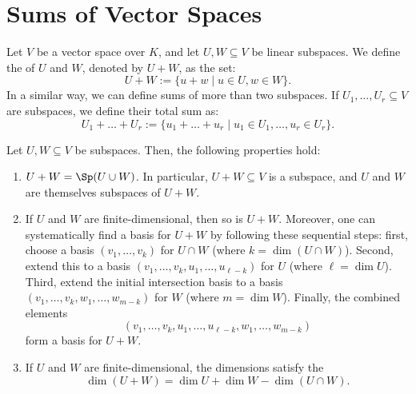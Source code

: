 \renewcommand{\thetheorem}{14.\arabic{theorem}}
\setcounter{theorem}{0}
\setcounter{chapter}{13} %


\chapter{Sums of Vector Spaces}

\begin{definition}
\label{def:sum_of_subspaces}
Let $V$ be a vector space over $K$, and let $U, W \subseteq V$ be linear subspaces. We define the  of $U$ and $W$, denoted by $U + W$, as the set:
\[
U + W := \{u + w \mid u \in U, w \in W\}.
\]
In a similar way, we can define sums of more than two subspaces. If $U_1, \dots, U_r \subseteq V$ are subspaces, we define their total sum as:
\[
U_1 + \dots + U_r := \{u_1 + \dots + u_r \mid u_1 \in U_1, \dots, u_r \in U_r\}.
\]
\end{definition}

\begin{proposition}
\label{prop:properties_of_sums}
Let $U, W \subseteq V$ be subspaces. Then, the following properties hold:
\begin{enumerate}[label=\textbf{(\alph*)}]
    \item $U + W = \Sp(U \cup W)$. In particular, $U + W \subseteq V$ is a subspace, and $U$ and $W$ are themselves subspaces of $U + W$.
    \item If $U$ and $W$ are finite-di\-men\-sional, then so is $U + W$. Moreover, one can systematically find a basis for $U + W$ by following these sequential steps: first, choose a basis $(v_1, \dots, v_k)$ for $U \cap W$ (where $k = \dim(U \cap W)$). Second, extend this to a basis $(v_1, \dots, v_k, u_1, \dots, u_{\ell-k})$ for $U$ (where $\ell = \dim U$). Third, extend the initial intersection basis to a basis $(v_1, \dots, v_k, w_1, \dots, w_{m-k})$ for $W$ (where $m = \dim W$). Finally, the combined elements 
    \[(v_1, \dots, v_k, u_1, \dots, u_{\ell-k}, w_1, \dots, w_{m-k})\] 
    form a basis for $U + W$.
    \item \label{item:dimension_formula_sums} If $U$ and $W$ are finite-di\-men\-sional, the dimensions satisfy the 
    \[
    \dim(U + W) = \dim U + \dim W - \dim(U \cap W).
    \]
\end{enumerate}
\end{proposition}


